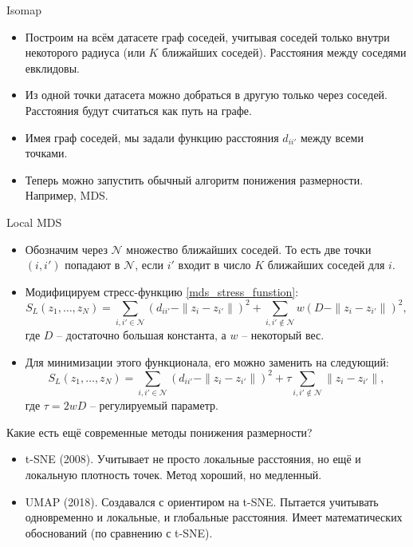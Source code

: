 \documentclass[9pt]{beamer}
\begin{document}

\begin{frame}{Isomap}
\begin{itemize}
    \item Построим на всём датасете граф соседей, учитывая соседей только внутри некоторого радиуса (или $K$ ближайших соседей). Расстояния между соседями евклидовы.
    \item Из одной точки датасета можно добраться в другую только через соседей. Расстояния будут считаться как путь на графе.
    \item Имея граф соседей, мы задали функцию расстояния $d_{ii'}$ между всеми точками.
    \item Теперь можно запустить обычный алгоритм понижения размерности. Например, MDS.
\end{itemize}
\end{frame}


\begin{frame}{Local MDS}
\begin{itemize}
    \item Обозначим через $\mathcal{N}$ множество ближайших соседей. То есть две точки $(i, i')$ попадают в $\mathcal{N}$, если $i'$ входит в число $K$ ближайших соседей для $i$.
    \item Модифицируем стресс-функцию \eqref{mds_stress_funstion}:
    $$S_L(z_1, \ldots, z_N) = \sum_{i, i'\in \mathcal{N}} (d_{ii'} - \|z_i - z_{i'}\|)^2 + \sum_{i, i'\not\in \mathcal{N}} w(D - \|z_i - z_{i'}\|)^2,$$
    где $D$ -- достаточно большая константа, а $w$ -- некоторый вес.
    \item Для минимизации этого функционала, его можно заменить на следующий:
    $$S_L(z_1, \ldots, z_N) = \sum_{i, i'\in \mathcal{N}} (d_{ii'} - \|z_i - z_{i'}\|)^2 + \tau \sum_{i, i'\not\in \mathcal{N}} \|z_i - z_{i'}\|,$$
    где $\tau = 2wD$ -- регулируемый параметр.
\end{itemize}
\end{frame}

\begin{frame}{Какие есть ещё современные методы понижения размерности?}
\begin{itemize}
    \item t-SNE (2008). Учитывает не просто локальные расстояния, но ещё и локальную плотность точек. Метод хороший, но медленный.
    \item UMAP (2018). Создавался с ориентиром на t-SNE. Пытается учитывать одновременно и локальные, и глобальные расстояния. Имеет математических обоснований (по сравнению с t-SNE).
\end{itemize}
    
\end{frame}
\end{document}
